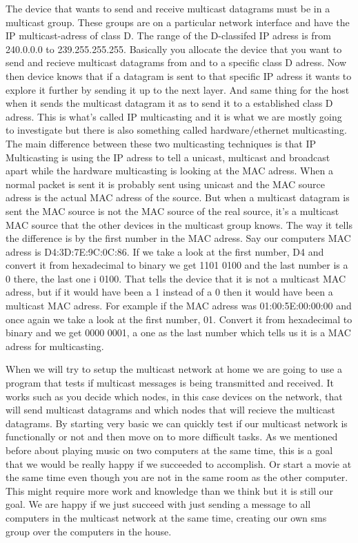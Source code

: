 \documentclass[9pt,a4paper]{acmproc}
\begin{document}
The device that wants to send and receive multicast datagrams must be in a multicast group. These groups are on a particular network interface and have the IP multicast-adress of class D. The range of the D-classifed IP adress is from 240.0.0.0 to 239.255.255.255. Basically you allocate the device that you want to send and recieve multicast datagrams from and to a specific class D adress. Now then device knows that if a datagram is sent to that specific IP adress it wants to explore it further by sending it up to the next layer. And same thing for the host when it sends the multicast datagram it as to send it to a established class D adress. This is what’s called IP multicasting and it is what we are mostly going to investigate but there is also something called hardware/ethernet multicasting. The main difference between these two multicasting techniques is that IP Multicasting is using the IP adress to tell a unicast, multicast and broadcast apart while the hardware multicasting is looking at the MAC adress. When a normal packet is sent it is probably sent using unicast and the MAC source adress is the actual MAC adress of the source. But when a multicast datagram is sent the MAC source is not the MAC source of the real source, it’s a multicast MAC source that the other devices in the multicast group knows. The way it tells the difference is by the first number in the MAC adress. Say our computers MAC adress is D4:3D:7E:9C:0C:86. If we take a look at the first number, D4 and convert it from hexadecimal to binary we get 1101 0100 and the last number is a 0 there, the last one i 0100. That tells the device that it is not a multicast MAC adress, but if it would have been a 1 instead of a 0 then it would have been a multicast MAC adress. For example if the MAC adress was 01:00:5E:00:00:00 and once again we take a look at the first number, 01. Convert it from hexadecimal to binary and we get 0000 0001, a one as the last number which tells us it is a MAC adress for multicasting.

When we will try to setup the multicast network at home we are going to use a program that tests if multicast messages is being transmitted and received. It works such as you decide which nodes, in this case devices on the network, that will send multicast datagrams and which nodes that will recieve the multicast datagrams. By starting very basic we can quickly test if our multicast network is functionally or not and then move on to more difficult tasks. As we mentioned before about playing music on two computers at the same time, this is a goal that we would be really happy if we succeeded to accomplish. Or start a movie at the same time even though you are not in the same room as the other computer. This might require more work and knowledge than we think but it is still our goal. We are happy if we just succeed with just sending a message to all computers in the multicast network at the same time, creating our own sms group over the computers in the house.
\end{document}
